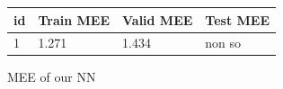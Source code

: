 

\begin{figure}
    \centering
    \begin{tabular}{|l|l|l|l|}
        \hline
        id & Train MEE & Valid MEE & Test MEE \\ \hline
        1 & 1.271 & 1.434 & non so \\ \hline
    \end{tabular}
    \caption{MEE of our NN}
    \label{fig:cup55-table}
\end{figure}



